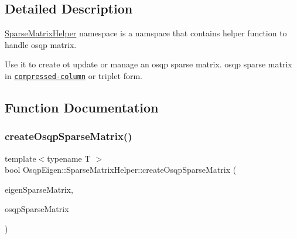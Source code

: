

\subsection{Detailed Description}
\mbox{\hyperlink{namespaceOsqpEigen_1_1SparseMatrixHelper}{Sparse\+Matrix\+Helper}} namespace is a namspace that contains helper function to handle osqp matrix. 

Use it to create ot update or manage an osqp sparse matrix. osqp sparse matrix in \href{https://people.sc.fsu.edu/~jburkardt/data/cc/cc.html}{\tt compressed-\/column} or triplet form. 

\subsection{Function Documentation}
\mbox{\label{namespaceOsqpEigen_1_1SparseMatrixHelper_afd0b552419320e79e627e5d6c9e5715c}} 
\subsubsection{\texorpdfstring{create\+Osqp\+Sparse\+Matrix()}{createOsqpSparseMatrix()}}
{\footnotesize\ttfamily template$<$typename T $>$ \\
bool Osqp\+Eigen\+::\+Sparse\+Matrix\+Helper\+::create\+Osqp\+Sparse\+Matrix (\begin{DoxyParamCaption}\item[{const Eigen\+::\+Sparse\+Matrix$<$ T $>$ \&}]{eigen\+Sparse\+Matrix,  }\item[{csc $\ast$\&}]{osqp\+Sparse\+Matrix }\end{DoxyParamCaption})}



